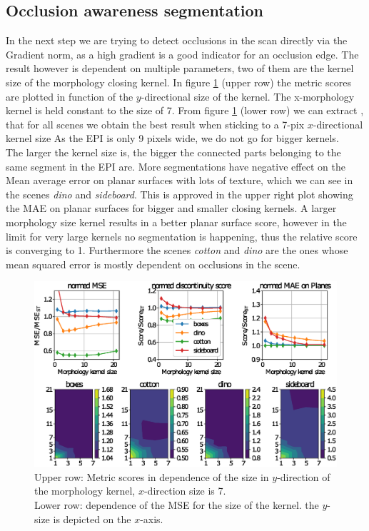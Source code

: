 \documentclass  [
  paper    = a4,
  BCOR     = 10mm,
  twoside,
  fontsize = 12pt,
  fleqn,
  toc      = bibnumbered,
  toc      = listofnumbered,
  numbers  = noendperiod,
  headings = normal,
  listof   = leveldown,
  version  = 3.03
]                                       {scrreprt}
\begin{document}
\subsection{Occlusion awareness segmentation}
\label{sec:occlusionawareness}
In the next step we are trying to detect occlusions in the scan directly via the Gradient norm, as a high gradient is a good indicator for an occlusion edge. The result however is dependent on multiple parameters, two of them are the kernel size of the morphology closing kernel. In figure \ref{fig:threshsegmmorph} (upper row) the metric scores are plotted in function of the $y$-directional size of the kernel. The x-morphology kernel is held constant to the size of 7. From figure \ref{fig:threshsegmmorph} (lower row) we can extract , that for all scenes we obtain the best result when sticking to a 7-pix $x$-directional kernel size As the EPI is only 9 pixels wide, we do not go for bigger kernels.\\
The larger the kernel size is, the bigger the connected parts belonging to the same segment in the EPI are. More segmentations have negative effect on the Mean average error on planar surfaces with lots of texture, which we can see in the scenes \textit{dino} and \textit{sideboard}. This is approved in the upper right plot showing the MAE on planar surfaces for bigger and smaller closing kernels. A larger morphology size kernel results in a better planar surface score, however in the limit for very large kernels no segmentation is happening, thus the relative score is converging to 1. Furthermore the scenes \textit{cotton} and \textit{dino} are the ones whose mean squared error is mostly dependent on occlusions in the scene. 
\begin{figure}
	\centering
	\includegraphics[width=1\linewidth]{images/thresh_segm_morph}
	\caption[Segmentation of EPI dependence on the morphology kernel]{Upper row: Metric scores in dependence of the size in $y$-direction of the morphology kernel, $x$-direction size is 7.\\ Lower row: dependence of the MSE for the size of the kernel. the $y$-size is depicted on the $x$-axis.}
	\label{fig:threshsegmmorph}
\end{figure}
\end{document}
